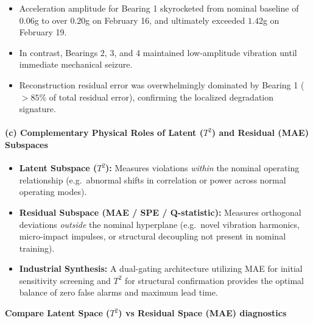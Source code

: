 \begin{tcolorbox}
\begin{itemize}
  \begin{itemize}
  \tightlist
  \item
    Acceleration amplitude for Bearing 1 skyrocketed from nominal baseline of \(0.06\)g to over \(0.20\)g on February 16, and ultimately exceeded \(1.42\)g on February 19.
  \item
    In contrast, Bearings 2, 3, and 4 maintained low-amplitude vibration until immediate mechanical seizure.
  \item
    Reconstruction residual error was overwhelmingly dominated by Bearing 1 (\(>85\%\) of total residual error), confirming the localized degradation signature.
  \end{itemize}
\end{itemize}

\paragraph{\texorpdfstring{\textbf{(c) Complementary Physical Roles of Latent (\(T^2\)) and Residual (MAE) Subspaces}}{(c) Complementary Physical Roles of Latent (T\^{}2) and Residual (MAE) Subspaces}}

\begin{itemize}
\tightlist
\item
  \textbf{Latent Subspace (\(T^2\)):} Measures violations \emph{within} the nominal operating relationship (e.g.~abnormal shifts in correlation or power across normal operating modes).
\item
  \textbf{Residual Subspace (MAE / SPE / Q-statistic):} Measures orthogonal deviations \emph{outside} the nominal hyperplane (e.g.~novel vibration harmonics, micro-impact impulses, or structural decoupling not present in nominal training).
\item
  \textbf{Industrial Synthesis:} A dual-gating architecture utilizing MAE for initial sensitivity screening and \(T^2\) for structural confirmation provides the optimal balance of zero false alarms and maximum lead time.
\end{itemize}
\end{tcolorbox}
\vspace{0.3em}
\vspace{0.3em}
\begin{tcolorbox}[colback=gray!5!white,colframe=gray!50!black,boxrule=0.5pt,arc=2pt,left=5pt,right=5pt,top=2pt,bottom=2pt,unbreakable,before upper={\sloppy\raggedright}]
{\small\bfseries Compare Latent Space ($T^2$) vs Residual Space (MAE) diagnostics\par}
\end{tcolorbox}
